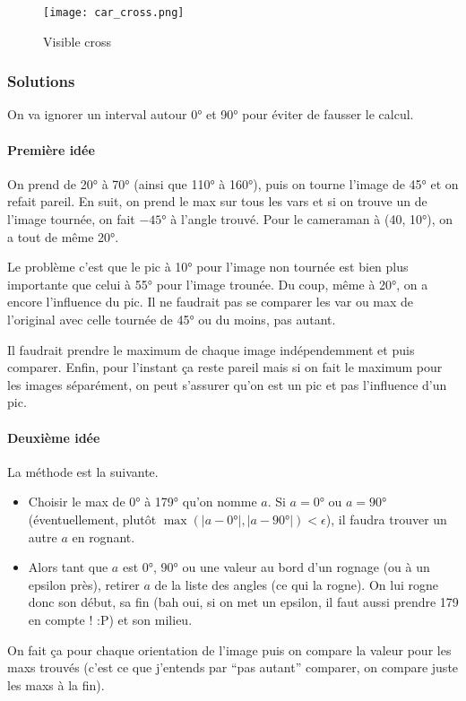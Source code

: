 \documentclass{article}
\begin{document}
\begin{figure}[!ht]
  \centering
  \texttt{[image: car\_cross.png]}
  \caption{Visible cross}
  \label{fig:car_cross}
\end{figure}

\subsubsection{Solutions}
On va ignorer un interval autour \ang{0} et \ang{90} pour éviter de fausser le calcul.
\paragraph{Première idée}
On prend de \ang{20} à \ang{70} (ainsi que \ang{110} à \ang{160}), puis on tourne l'image de \ang{45} et on refait pareil.
En suit, on prend le max sur tous les vars et si on trouve un de l'image tournée, on fait $-\ang{45}$ à l'angle trouvé.
Pour le cameraman à (40, \ang{10}), on a tout de même \ang{20}.

Le problème c'est que le pic à \ang{10} pour l'image non tournée est bien plus importante que celui à \ang{55} pour l'image trounée.
Du coup, même à \ang{20}, on a encore l'influence du pic.
Il ne faudrait pas se comparer les var ou max de l'original avec celle tournée de \ang{45} ou du moins, pas autant.

Il faudrait prendre le maximum de chaque image indépendemment et puis comparer.
Enfin, pour l'instant ça reste pareil mais si on fait le maximum pour les images séparément, on peut s'assurer qu'on est un pic et pas l'influence d'un pic.

\paragraph{Deuxième idée}
La méthode est la suivante.
\begin{itemize}
  \item Choisir le max de \ang{0} à \ang{179} qu'on nomme $a$.
    Si $a = \ang{0}$ ou $a = \ang{90}$ (éventuellement, plutôt $\max(|a - \ang{0}|, |a-\ang{90}|) < \epsilon$), il faudra trouver un autre $a$ en rognant.
  \item
    Alors tant que $a$ est \ang{0}, \ang{90} ou une valeur au bord d'un rognage (ou à un epsilon près),
    retirer $a$ de la liste des angles (ce qui la rogne).
    On lui rogne donc son début, sa fin (bah oui, si on met un epsilon, il faut aussi prendre 179 en compte ! :P) et son milieu.
\end{itemize}
On fait ça pour chaque orientation de l'image puis on compare la valeur pour les maxs trouvés (c'est ce que j'entends par ``pas autant'' comparer, on compare juste les maxs à la fin).
\end{document}
